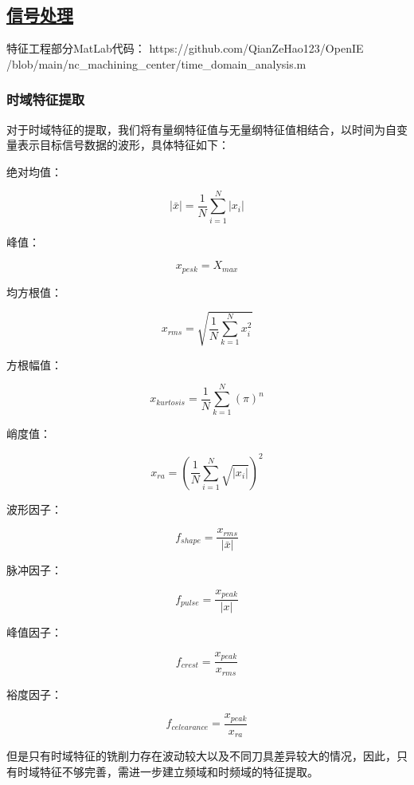 \subsection{\href{https://github.com/QianZeHao123/OpenIE/blob/main/nc_machining_center/time_domain_analysis.m}{信号处理}}
特征工程部分MatLab代码： https://github.com/QianZeHao123/OpenIE\\/blob/main/nc\_machining\_center/time\_domain\_analysis.m \par
\subsubsection{时域特征提取}
对于时域特征的提取，我们将有量纲特征值与无量纲特征值相结合，以时间为自变量表示目标信号数据的波形，具体特征如下：\par
绝对均值：\par
$$ |\bar{x}|=\frac{1}{N} \sum_{i=1}^{N}\left|x_{i}\right| $$\par
峰值：\par
$$ x_{pesk}=X_{max} $$\par
均方根值：\par
$$ x_{rms}=\sqrt{\frac{1}{N} \sum_{k=1}^{N} x_{i}^{2}} $$\par
方根幅值：\par
$$ x_{kurtosis}=\frac{1}{N} \sum_{k=1}^{N}(\pi)^{n} $$\par
峭度值：\par
$$ x_{ra}=\left(\frac{1}{N} \sum_{i=1}^{N} \sqrt{|x_i|}\right)^{2} $$\par
波形因子：\par
$$ f_{shape}=\frac{x_{rms}}{|\bar{x}|} $$\par
脉冲因子：\par
$$ f_{pulse}=\frac{x_{peak}}{|x|} $$\par
峰值因子：\par
$$ f_{crest}=\frac{x_{peak}}{x_{rms}} $$\par
裕度因子：\par
$$ f_{celearance}=\frac{x_{peak}}{x_{ra}} $$\par

但是只有时域特征的铣削力存在波动较大以及不同刀具差异较大的情况，因此，只有时域特征不够完善，需进一步建立频域和时频域的特征提取。\par

